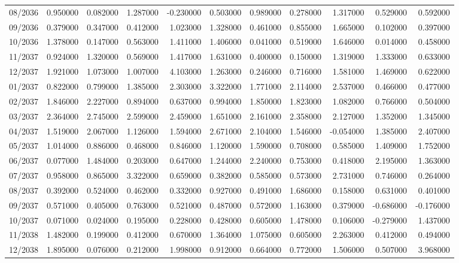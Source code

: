 \begin{tabular}{lrrrrrrrrrr}
08/2036 & 0.950000 & 0.082000 & 1.287000 & -0.230000 & 0.503000 & 0.989000 & 0.278000 & 1.317000 & 0.529000 & 0.592000 \\
09/2036 & 0.379000 & 0.347000 & 0.412000 & 1.023000 & 1.328000 & 0.461000 & 0.855000 & 1.665000 & 0.102000 & 0.397000 \\
10/2036 & 1.378000 & 0.147000 & 0.563000 & 1.411000 & 1.406000 & 0.041000 & 0.519000 & 1.646000 & 0.014000 & 0.458000 \\
11/2037 & 0.924000 & 1.320000 & 0.569000 & 1.417000 & 1.631000 & 0.400000 & 0.150000 & 1.319000 & 1.333000 & 0.633000 \\
12/2037 & 1.921000 & 1.073000 & 1.007000 & 4.103000 & 1.263000 & 0.246000 & 0.716000 & 1.581000 & 1.469000 & 0.622000 \\
01/2037 & 0.822000 & 0.799000 & 1.385000 & 2.303000 & 3.322000 & 1.771000 & 2.114000 & 2.537000 & 0.466000 & 0.477000 \\
02/2037 & 1.846000 & 2.227000 & 0.894000 & 0.637000 & 0.994000 & 1.850000 & 1.823000 & 1.082000 & 0.766000 & 0.504000 \\
03/2037 & 2.364000 & 2.745000 & 2.599000 & 2.459000 & 1.651000 & 2.161000 & 2.358000 & 2.127000 & 1.352000 & 1.345000 \\
04/2037 & 1.519000 & 2.067000 & 1.126000 & 1.594000 & 2.671000 & 2.104000 & 1.546000 & -0.054000 & 1.385000 & 2.407000 \\
05/2037 & 1.014000 & 0.886000 & 0.468000 & 0.846000 & 1.120000 & 1.590000 & 0.708000 & 0.585000 & 1.409000 & 1.752000 \\
06/2037 & 0.077000 & 1.484000 & 0.203000 & 0.647000 & 1.244000 & 2.240000 & 0.753000 & 0.418000 & 2.195000 & 1.363000 \\
07/2037 & 0.958000 & 0.865000 & 3.322000 & 0.659000 & 0.382000 & 0.585000 & 0.573000 & 2.731000 & 0.746000 & 0.264000 \\
08/2037 & 0.392000 & 0.524000 & 0.462000 & 0.332000 & 0.927000 & 0.491000 & 1.686000 & 0.158000 & 0.631000 & 0.401000 \\
09/2037 & 0.571000 & 0.405000 & 0.763000 & 0.521000 & 0.487000 & 0.572000 & 1.163000 & 0.379000 & -0.686000 & -0.176000 \\
10/2037 & 0.071000 & 0.024000 & 0.195000 & 0.228000 & 0.428000 & 0.605000 & 1.478000 & 0.106000 & -0.279000 & 1.437000 \\
11/2038 & 1.482000 & 0.199000 & 0.412000 & 0.670000 & 1.364000 & 1.075000 & 0.605000 & 2.263000 & 0.412000 & 0.494000 \\
12/2038 & 1.895000 & 0.076000 & 0.212000 & 1.998000 & 0.912000 & 0.664000 & 0.772000 & 1.506000 & 0.507000 & 3.968000 \\

\end{tabular}
